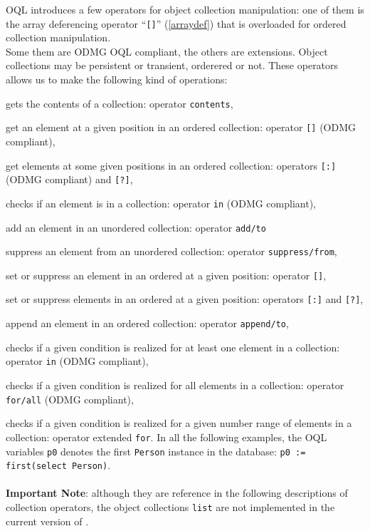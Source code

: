 \label{collexp}
OQL introduces a few operators for object collection manipulation:
one of them is the array deferencing operator ``\texttt{[]}''
(\ref{arraydef}) that
is overloaded for ordered collection manipulation.\\
Some them are ODMG OQL compliant, the others are \eyedb extensions.
Object collections may be persistent or transient, orderered or not.
These operators allows us to make the following kind of operations:
\be
\item gets the contents of a collection: operator \texttt{contents},
\item get an element at a given position in an ordered collection:
operator \texttt{[]} (ODMG compliant),
\item get elements at some given positions in an ordered collection:
operators \texttt{[:]} (ODMG compliant) and \texttt{[?]},
\item checks if an element is in a collection: operator \texttt{in} (ODMG
compliant),
\item add an element in an unordered collection:
operator \texttt{add/to}
\item suppress an element from an unordered collection:
operator \texttt{suppress/from},
\item set or suppress an element in an ordered at a given position:
operator \texttt{[]},
\item set or suppress elements in an ordered at a given position:
operators \texttt{[:]} and \texttt{[?]},
\item append an element in an ordered collection:
operator \texttt{append/to},
\item checks if a given condition is realized for at least one
element in a collection: operator \texttt{in} (ODMG compliant),
\item checks if a given condition is realized for all
elements in a collection: operator \texttt{for/all} (ODMG compliant),
\item checks if a given condition is realized for a given
number range of elements in a collection: operator extended \texttt{for}.
\ee
In all the following examples, the OQL variables \texttt{p0} denotes
the first \texttt{Person} instance in the database:
\texttt{p0 := first(select Person)}.\\\\
{\bf Important Note}: although they are reference in the following
descriptions of collection operators,
the object collections \texttt{list} are not
implemented in the current version of \eyedbX. 
